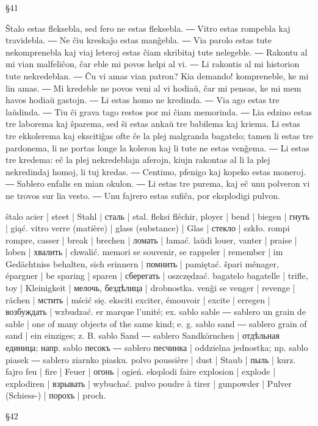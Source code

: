 §41

Ŝtalo estas fleksebla, sed fero ne estas fleksebla. ― Vitro estas rompebla kaj travidebla. ― Ne ĉiu kreskaĵo estas manĝebla. ― Via parolo estas tute nekomprenebla kaj viaj leteroj estas ĉiam skribitaj tute nelegeble. ― Rakontu al mi vian malfeliĉon, ĉar eble mi povos helpi al vi. ― Li rakontis al mi historion tute nekredeblan. ― Ĉu vi amas vian patron? Kia demando! kompreneble, ke mi lin amas. ― Mi kredeble ne povos veni al vi hodiaŭ, ĉar mi pensas, ke mi mem havos hodiaŭ gastojn. ― Li estas homo ne kredinda. ― Via ago estas tre laŭdinda. ― Tiu ĉi grava tago restos por mi ĉiam memorinda. ― Lia edzino estas tre laborema kaj ŝparema, sed ŝi estas ankaŭ tre babilema kaj kriema. Li estas tre ekkolerema kaj ekscitiĝas ofte ĉe la plej malgranda bagatelo; tamen li estas tre pardonema, li ne portas longe la koleron kaj li tute ne estas venĝema. ― Li estas tre kredema: eĉ la plej nekredeblajn aferojn, kiujn rakontas al li la plej nekredindaj homoj, li tuj kredas. ― Centimo, pfenigo kaj kopeko estas moneroj. ― Sablero enfalis en mian okulon. ― Li estas tre purema, kaj eĉ unu polveron vi ne trovos sur lia vesto. ― Unu fajrero estas sufiĉa, por eksplodigi pulvon.

ŝtalo acier | steet | Stahl | сталь | stal.
fleksi fléchir, ployer | bend | biegen | гнуть | giąć.
vitro verre (matière) | glass (substance) | Glas | стекло | szkło.
rompi rompre, casser | break | brechen | ломать | łamać.
laŭdi louer, vanter | praise | loben | хвалить | chwalić.
memori se souvenir, se rappeler | remember | im Gedächtniss behalten, sich erinnern | помнить | pamiętać.
ŝpari ménager, épargner | be sparing | sparen | сберегать | oszczędzać.
bagatelo bagatelle | trifle, toy | Kleinigkeit | мелочь, бездѣлица | drobnostka.
venĝi se venger | revenge | rächen | мстить | mścić się.
eksciti exciter, émouvoir | excite | erregen | возбуждать | wzbudzać.
er marque l’unité; ex. sablo sable ― sablero un grain de sable | one of many objects of the same kind; e. g. sablo sand ― sablero grain of sand | ein einziges; z. B. sablo Sand ― sablero Sandkörnchen | отдѣльная единица; напр. sablo песокъ ― sablero песчинка | oddzielna jednostka; np. sablo piasek ― sablero ziarnko piasku.
polvo poussière | dust | Staub | пыль | kurz.
fajro feu | fire | Feuer | огонь | ogień.
eksplodi faire explosion | explode | explodiren | взрывать | wybuchać.
pulvo poudre à tirer | gunpowder | Pulver (Schiess-) | порохъ | proch.

§42

